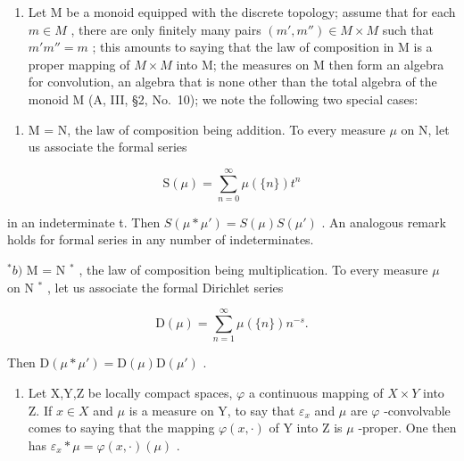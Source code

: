 \begin{enumerate}
\def\labelenumi{\arabic{enumi})}
\setcounter{enumi}{1}
\tightlist
\item
  Let M be a monoid equipped with the discrete topology; assume that for each \(m \in M\) , there are only finitely many pairs \((m', m'') \in M \times M\) such that \(m'm'' = m\) ; this amounts to saying that the law of composition in M is a proper mapping of \(M \times M\) into M; the measures on M then form an algebra for convolution, an algebra that is none other than the total algebra of the monoid M (A, III, §2, No.~10); we note the following two special cases:
\end{enumerate}

\begin{enumerate}
\def\labelenumi{\alph{enumi})}
\tightlist
\item
  M = N, the law of composition being addition. To every measure \(\mu\) on N, let us associate the formal series
\end{enumerate}

\[
\mathrm{S} (\mu) = \sum_ {n = 0} ^ {\infty} \mu (\{n \}) t ^ {n}
\]

in an indeterminate t. Then \(S(\mu * \mu') = S(\mu)S(\mu')\) . An analogous remark holds for formal series in any number of indeterminates.

\(^{*}b)\) M = N \(^{*}\) , the law of composition being multiplication. To every measure \(\mu\) on N \(^{*}\) , let us associate the formal Dirichlet series

\[
\mathrm{D} (\mu) = \sum_ {n = 1} ^ {\infty} \mu (\{n \}) n ^ {- s}.
\]

Then \(\mathrm{D}(\mu * \mu') = \mathrm{D}(\mu) \mathrm{D}(\mu')\) .

\begin{enumerate}
\def\labelenumi{\arabic{enumi})}
\setcounter{enumi}{2}
\tightlist
\item
  Let X,Y,Z be locally compact spaces, \(\varphi\) a continuous mapping of \(X \times Y\) into Z. If \(x \in X\) and \(\mu\) is a measure on Y, to say that \(\varepsilon_{x}\) and \(\mu\) are \(\varphi\) -convolvable comes to saying that the mapping \(\varphi(x,\cdot)\) of Y into Z is \(\mu\) -proper. One then has \(\varepsilon_{x} * \mu = \varphi(x,\cdot)(\mu)\) .
\end{enumerate}

